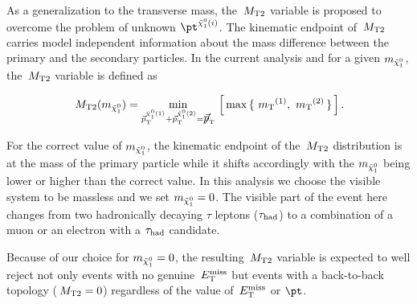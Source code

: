 As a generalization to the transverse mass, the $\,{M_{\rm T2}}$ variable is proposed to overcome the problem of unknown $\pt^{\neutralino(i)}$. The kinematic endpoint of $\,{M_{\rm T2}}$ carries model independent information about the mass difference between the primary and the secondary particles. In the current analysis and for a given $m_{\tilde{\chi}^{0}_1}$, the $\,{M_{\rm T2}}$ variable is defined as
\begin{linenomath}
\begin{equation}
\label{eq:mt2def}
\,{M_{\rm T2}}(m_{\tilde{\chi}^{0}_1})= \min_{\vec{p}_{\rm T}^{\tilde{\chi}^{0}_1(1)}+\vec{p}_{\rm T}^{\tilde{\chi}^{0}_1(2)}={\displaystyle{\not}\vec{p}}_{\rm T}}\,\left[\,\max\,\{ \, \,{m_{\rm T}}^{(1)},\,\,{m_{\rm T}}^{(2)}\,\}\,\right].
\end{equation}
\end{linenomath}
For the correct value of $m_{\tilde{\chi}^{0}_1}$, the kinematic endpoint of the $\,{M_{\rm T2}}$ distribution is at the mass of the primary particle while it shifts accordingly with the $m_{\tilde{\chi}^{0}_1}$ being lower or higher than the correct value. In this analysis we choose the visible system to be massless and we set $m_{\tilde{\chi}^{0}_1}=0$. The visible part of the event here changes from two hadronically decaying $\tau$ leptons ($\tau_{\rm had}$) to a combination of a muon or an electron with a $\tau_{\rm had}$ candidate. 

Because of our choice for $m_{\tilde{\chi}^{0}_1}=0$, the resulting $\,{M_{\rm T2}}$ variable is expected to well reject not only events with no genuine $\,{E_{\rm T}^{\rm miss}}$ but events with a back-to-back topology ($\,{M_{\rm T2}}=0$) regardless of the value of $\,{E_{\rm T}^{\rm miss}}$ or $\pt$. 
